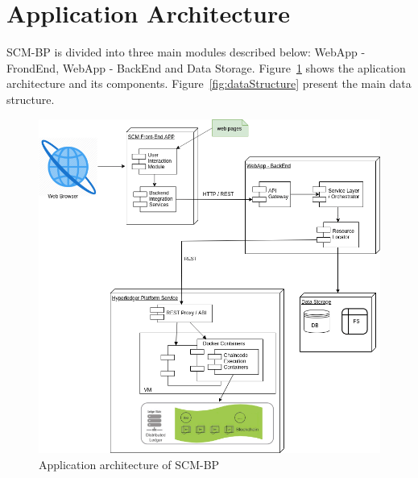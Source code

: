 \section{Application Architecture}\label{sec:applicationArchitecture}

\ac{SCM-BP} is divided into three main modules described below: WebApp - FrondEnd, WebApp - BackEnd and Data Storage. Figure~\ref{fig:detalhamentotecnico} shows the aplication architecture and its components. Figure~\ref{fig:dataStructure} present the main data structure.

\begin{figure}[htbp]
\begin{center}
  \includegraphics[scale=0.55]{images/detalhamentotecnico.png}
\caption{Application architecture of \ac{SCM-BP}}
\label{fig:detalhamentotecnico}
\end{center}
\end{figure}



